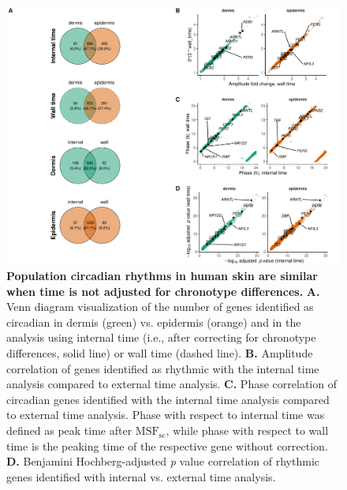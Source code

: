 \begin{figure}[htb!]
	\begin{center}
		\includegraphics[scale=0.55]{./Figures/suppfig1.pdf}
		\caption{\textbf{Population circadian rhythms in human skin are similar when time is not adjusted for chronotype differences.} \textbf{A.} Venn diagram visualization of the number of genes identified as circadian in dermis (green) vs. epidermis (orange) and in the analysis using internal time (i.e., after correcting for chronotype differences, solid line) or wall time (dashed line). \textbf{B.} Amplitude correlation of genes identified as rhythmic with the internal time analysis compared to external time analysis. \textbf{C.} Phase correlation of circadian genes identified with the internal time analysis compared to external time analysis. Phase with respect to internal time was defined as peak time after $\textrm{MSF}_\textrm{sc}$, while phase with respect to wall time is the peaking time of the respective gene without correction. \textbf{D. }Benjamini Hochberg-adjusted \textit{p} value correlation of rhythmic genes identified with internal vs. external time analysis. \\
	}
		\label{fig:suppfig1}
	\end{center}
\end{figure}
\clearpage


